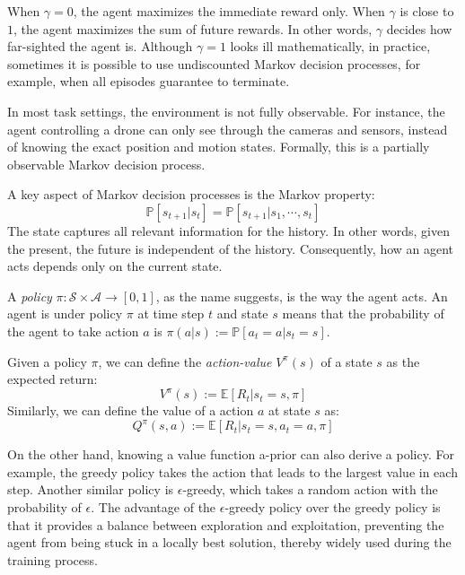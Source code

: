        When $\gamma=0$, the agent maximizes the immediate reward only.
        When $\gamma$ is close to $1$, the agent maximizes the sum of future rewards.
        In other words, $\gamma$ decides how far-sighted the agent is.
        Although $\gamma=1$ looks ill mathematically,
        in practice, sometimes it is possible to use undiscounted Markov decision processes,
        for example, when all episodes guarantee to terminate.

        In most task settings, the environment is not fully observable.
        For instance, the agent controlling a drone can only see through the cameras and sensors,
        instead of knowing the exact position and motion states.
        Formally, this is a partially observable Markov decision process.

        A key aspect of Markov decision processes is the Markov property:
        \[
        \mathbb{P}[s_{t+1} | s_t] = \mathbb{P}[s_{t+1} | s_1, \cdots, s_t] 
        \]
        The state captures all relevant information for the history.
        In other words, given the present, the future is independent of the history.
        Consequently, how an agent acts depends only on the current state.

        A \emph{policy} $\pi : \mathcal{S} \times \mathcal{A} \rightarrow [0,1]$,
        as the name suggests, is the way the agent acts.
        An agent is under policy $\pi$ at time step $t$ and state $s$ means that
        the probability of the agent to take action $a$ is
        $\pi(a|s) := \mathbb{P}[a_t=a | s_t=s]$.

        Given a policy $\pi$, we can define the \emph{action-value} $V^{\pi}(s)$ of a state $s$ as
        the expected return:
        \[ V^{\pi}(s) :=  \mathbb{E}[R_t | s_t=s, \pi] \]
        Similarly, we can define the value of a action $a$ at state $s$ as:
        \[ Q^{\pi}(s,a) := \mathbb{E}[R_t | s_t=s, a_t=a, \pi] \]

        On the other hand, knowing a value function a-prior can also derive a policy.
        For example, the greedy policy takes the action that leads to the largest value in each step.
        Another similar policy is $\epsilon$-greedy,
        which takes a random action with the probability of $\epsilon$.
        The advantage of the $\epsilon$-greedy policy over the greedy policy is that
        it provides a balance between exploration and exploitation,
        preventing the agent from being stuck in a locally best solution,
        thereby widely used during the training process.


